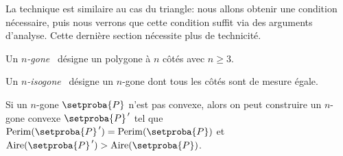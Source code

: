 La technique est similaire au cas du triangle: nous allons obtenir une condition nécessaire, puis nous verrons que cette condition suffit via des arguments d'analyse. Cette dernière section nécessite plus de technicité.




\begin{defi}
	Un \og \emph{$n$-gone} \fg\ désigne un polygone à $n$ côtés avec $n \geq 3$.
\end{defi}


\begin{defi}
	Un \og \emph{$n$-isogone} \fg\ désigne un $n$-gone dont tous les côtés sont de mesure égale.
\end{defi}




\begin{fact} \label{conv-poly}
	Si un $n$-gone $\setproba{P}$ n'est pas convexe, alors on peut construire un $n$-gone convexe $\setproba{P}^{\,\prime}$ tel que 
	$\perim{\setproba{P}^{\,\prime}} = \perim{\setproba{P}}$ 
	et 
	$\area{\setproba{P}^{\,\prime}} > \area{\setproba{P}}$.
\end{fact}


